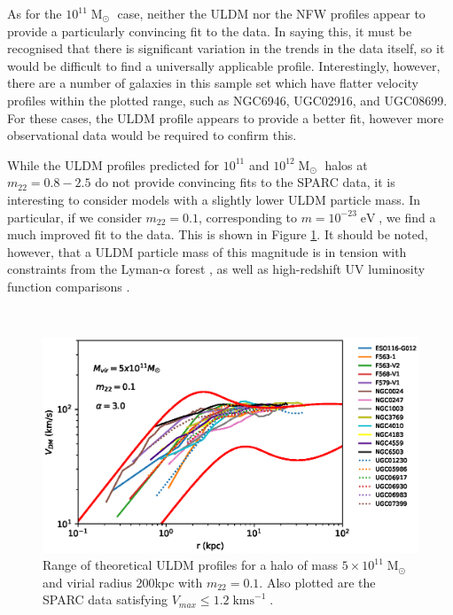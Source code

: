 \documentclass[a4paper,11pt]{article}
\begin{document}
As for the $10^{11}\operatorname{M}_{\odot}$ case, neither the ULDM nor the NFW profiles appear to provide a particularly convincing fit to the data. In saying this, it must be recognised that there is significant variation in the trends in the data itself, so it would be difficult to find a universally applicable profile. Interestingly, however, there are a number of galaxies in this sample set which have flatter velocity profiles within the plotted range, such as NGC6946, UGC02916, and UGC08699. For these cases, the ULDM profile appears to provide a better fit, however more observational data would be required to confirm this. 

While the ULDM profiles predicted for $10^{11}$ and $10^{12} \operatorname{M}_{\odot}$ halos at $m_{22} = 0.8 - 2.5$ do not provide convincing fits to  the SPARC data, it is interesting to consider models with a slightly lower ULDM particle mass. In particular, if we consider $m_{22} = 0.1$, corresponding to $m = 10^{-23} \operatorname{eV}$, we find a much improved fit to the data. This is shown in Figure \ref{fig:velocity_23}. It should be noted, however, that a ULDM particle mass of this magnitude is in tension with constraints from the Lyman-$\alpha$ forest \cite{Amendola:2005ad}, as well as high-redshift UV luminosity function comparisons \cite{Bozek:2014uqa}. 

\\
\begin{figure}
\centering
\includegraphics[scale = 0.7, trim={0cm 2.5cm 1cm 0.5cm}]{pics/best_match.eps} 
\caption{Range of theoretical ULDM profiles for a halo of mass $5\times 10^{11}\operatorname{M}_{\odot}$ and virial radius 200kpc with $m_{22} = 0.1$. Also plotted are the SPARC data satisfying $V_{max}\leq 1.2 \operatorname{kms}^{-1}$.}\label{fig:velocity_23}
\end{figure}
\end{document}
